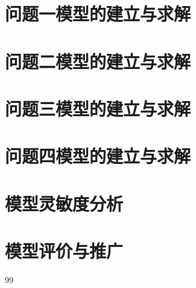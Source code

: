 \documentclass[withoutpreface,bwprint]{cumcmthesis}
\begin{document}
	\section{问题一模型的建立与求解}
	\section{问题二模型的建立与求解}
	\section{问题三模型的建立与求解}
	\section{问题四模型的建立与求解}
	\section{模型灵敏度分析}
	\section{模型评价与推广}
	
	\newpage
	\begin{thebibliography}{99}
	\end{thebibliography}
	
\end{document}
